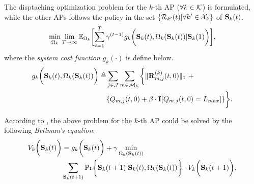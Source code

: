 \begin{problem}
    The disptaching optimization problem for the $k$-th AP ($\forall k\in\mathcal{K}$) is formulated, while the other APs follows the policy in the set $\{ \mathcal{R}_{k'}(t) | \forall k'\in\mathcal{X}_{k} \}$ of $\mathbf{S}_{k}(t)$.
    \begin{align}
        \min_{\Omega_{k}} \lim_{T \to \infty}
            \mathbb{E}_{\Omega_{k}} \Bracket{
                \sum_{t=1}^{T} \gamma^{(t-1)} g_{k}\Paren{\Stat_{k}(t), \Omega_{k}(\Stat_{k}(t)) | \Stat_{k}(1)}
            },
    \end{align}
    where the \emph{system cost function} $g_{k}(\cdot)$ is define below.
    \begin{align}
        g_{k}\Paren{\Stat_{k}(t), \Omega_{k}(\Stat_{k}(t))} \define
            &\sum_{j\in\jSpace} \sum_{m\in\esSet_{\apSet}} \Brace{
                \Inorm{\vec{R}^{(k)}_{m,j}(t,0)}~+
                \nonumber\\
                &\{ Q_{m,j}(t,0) + \beta \cdot \mat{I}[Q_{m,j}(t,0)=L_{max}] \}
            }.
    \end{align}
    \label{problem_2}
\end{problem}
According to \cite{sutton1998introduction}, the above problem for the $k$-th AP could be solved by the following \emph{Bellman's equation}:
\begin{align}
    V_{k}\Paren{\Stat_{k}(t)} &= g_{k}\Paren{ \Stat_{k}(t) } + \gamma\min_{\Omega_{k}(\Stat_{k}(t))}
    \nonumber\\
    &\sum_{\Stat_{k}(t+1)} \Pr\Brace{ \Stat_{k}(t+1) | \Stat_{k}(t), \Omega_{k}(\Stat_{k}(t)) } \cdot V_{k}\Paren{\Stat_{k}(t+1)}.
    \label{eqn:sp_1}
\end{align}


